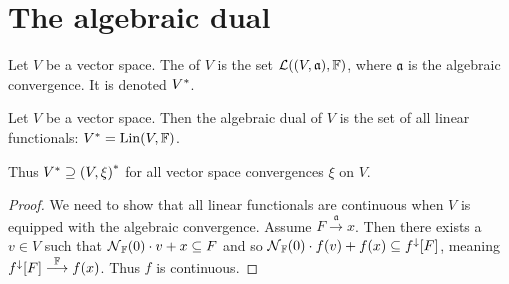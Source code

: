 \section{The algebraic dual}
\begin{definition}
Let $V$ be a vector space. The  of $V$ is the set $\contLin(\sSet{V,\mathfrak{a}}, \F)$, where $\mathfrak{a}$ is the algebraic convergence. It is denoted ${V}^*$.
\end{definition}

\begin{proposition} \label{algebraicDual}
Let $V$ be a vector space. Then the algebraic dual of $V$ is the set of all linear functionals: $V^* = \operatorname{Lin}(V,\mathbb{F})$.

Thus $V^* \supseteq \sSet{V,\xi}^*$ for all vector space convergences $\xi$ on $V$.
\end{proposition}
\begin{proof}
We need to show that all linear functionals are continuous when $V$ is equipped with the algebraic convergence. Assume $F\overset{\mathfrak{a}}{\longrightarrow} x$. Then there exists a $v\in V$ such that $\operatorname{\mathcal{N}}_{\mathbb{F}}(0)\cdot v+x \subseteq F$ and so $\operatorname{\mathcal{N}}_{\mathbb{F}}(0)\cdot f(v)+f(x) \subseteq f^\downarrow[F]$, meaning $f^\downarrow[F] \overset{\mathbb{F}}{\longrightarrow} f(x)$. Thus $f$ is continuous.
\end{proof}


